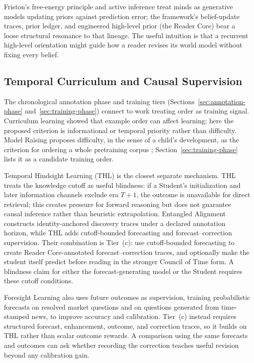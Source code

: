 \documentclass[11pt]{article}
\begin{document}
Friston's free-energy principle and active inference
\cite{friston2010free, parr2019generalised} treat minds as generative models
updating priors against prediction error; the framework's belief-update
traces, prior ledger, and engineered high-level prior (the Reader Core) bear a
loose structural resonance to that lineage. The useful intuition is that a
recurrent high-level orientation might guide how a reader revises its world
model without fixing every belief.

\subsection{Temporal Curriculum and Causal Supervision}

The chronological annotation phase and training tiers
(Sections~\ref{sec:annotation-phase} and~\ref{sec:training-phase}) connect to
work treating order as training signal. Curriculum learning
\cite{bengio2009curriculum} showed that example order can affect learning; here
the proposed criterion is informational or temporal priority rather than
difficulty. Model Raising proposes difficulty, in the sense of a child's
development, as the criterion for ordering a whole pretraining corpus
\cite{aydin2026modelraising}; Section~\ref{sec:training-phase} lists it as a
candidate training order.

Temporal Hindsight Learning (THL) \cite{westerberg2026thl} is the closest
separate mechanism. THL treats the knowledge cutoff as useful blindness: if a
Student's initialization and later information channels exclude era $T+1$,
the outcome is unavailable for direct retrieval;
this creates pressure for forward reasoning but does not guarantee causal
inference rather than heuristic extrapolation. Entangled
Alignment constructs identity-anchored discovery traces under a declared
annotation horizon, while THL adds cutoff-bounded forecasting and
forecast--correction supervision.
Their combination is Tier~(c): use cutoff-bounded forecasting to create
Reader Core-annotated forecast--correction traces, and optionally make the
student itself predict before reading in the stronger Council of Time form.
A blindness claim for either the forecast-generating model or the Student
requires these cutoff conditions.

Foresight Learning \cite{turtel2025foresight, turtel2025rlvr,
turtel2026futureaslabel} also uses future outcomes as supervision, training
probabilistic forecasts on resolved market questions and on questions generated
from time-stamped news, to improve accuracy and calibration. Tier~(c)
instead requires structured forecast, enhancement, outcome, and correction
traces, so it builds on THL rather than scalar outcome rewards. A comparison
using the same forecasts and outcomes can ask whether recording the correction
teaches useful revision beyond any calibration gain.
\end{document}
